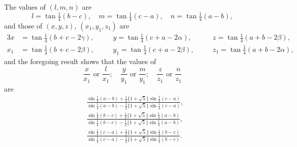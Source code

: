 \documentclass[11pt,a4paper]{book}
\begin{document}
The values of $(l, m, n)$ are
\[
l = \tan\tfrac{1}{4}(b - c),\quad m = \tan\tfrac{1}{4}(c - a),\quad n = \tan\tfrac{1}{4}(a - b),
\]
and those of $(x, y, z)$, $(x_1, y_1, z_1)$ are
\begin{alignat*}{3}
x &= \tan\tfrac{1}{4}(b + c - 2\gamma), &\quad& y = \tan\tfrac{1}{4}(c + a - 2\alpha), &\quad& z = \tan\tfrac{1}{4}(a + b - 2\beta),\\
x_1 &= \tan\tfrac{1}{4}(b + c - 2\beta), &\quad& y_1 = \tan\tfrac{1}{4}(c + a - 2\beta), &\quad& z_1 = \tan\tfrac{1}{4}(a + b - 2\alpha),
\end{alignat*}
and the foregoing result shows that the values of
\[
\frac{x}{x_1}\text{ or }\frac{l}{x_1};\quad \frac{y}{y_1}\text{ or }\frac{m}{y_1};\quad \frac{z}{z_1}\text{ or }\frac{n}{z_1}
\]
are
\begin{align*}
&\frac{\sin\tfrac{1}{4}(a - b) + \tfrac{1}{2}\{1 + \sqrt{5}\}\sin\tfrac{1}{4}(c - a)}{\sin\tfrac{1}{4}(a - b) - \tfrac{1}{2}\{1 + \sqrt{5}\}\sin\tfrac{1}{4}(c - a)},\\
&\frac{\sin\tfrac{1}{4}(b - c) + \tfrac{1}{2}\{1 + \sqrt{5}\}\sin\tfrac{1}{4}(a - b)}{\sin\tfrac{1}{4}(b - c) - \tfrac{1}{2}\{1 + \sqrt{5}\}\sin\tfrac{1}{4}(a - b)},\\
&\frac{\sin\tfrac{1}{4}(c - a) + \tfrac{1}{2}\{1 + \sqrt{5}\}\sin\tfrac{1}{4}(b - c)}{\sin\tfrac{1}{4}(c - a) - \tfrac{1}{2}\{1 + \sqrt{5}\}\sin\tfrac{1}{4}(b - c)}.
\end{align*}
\end{document}
